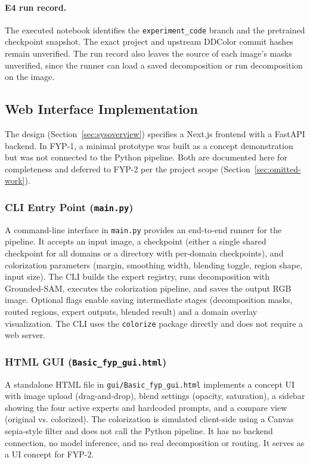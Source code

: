 \documentclass{FastFyp}
\begin{document}
\paragraph{E4 run record.} The executed notebook identifies the
\texttt{experiment\_code} branch and the pretrained checkpoint snapshot. The
exact project and upstream DDColor commit hashes remain unverified. The run
record also leaves the source of each image's masks unverified, since the
runner can load a saved decomposition or run decomposition on the image.

\subsection{Web Interface Implementation}
\label{subsec:web-interface}

The design (Section~\ref{sec:sysoverview}) specifies a Next.js frontend with a FastAPI backend. In FYP-1, a minimal prototype was built as a concept demonstration but was not connected to the Python pipeline. Both are documented here for completeness and deferred to FYP-2 per the project scope (Section~\ref{sec:omitted-work}).

\subsubsection{CLI Entry Point (\texttt{main.py})}
A command-line interface in \texttt{main.py} provides an end-to-end runner for the pipeline. It accepts an input image, a checkpoint (either a single shared checkpoint for all domains or a directory with per-domain checkpoints), and colorization parameters (margin, smoothing width, blending toggle, region shape, input size). The CLI builds the expert registry, runs decomposition with Grounded-SAM, executes the colorization pipeline, and saves the output RGB image. Optional flags enable saving intermediate stages (decomposition masks, routed regions, expert outputs, blended result) and a domain overlay visualization. The CLI uses the \texttt{colorize} package directly and does not require a web server.

\subsubsection{HTML GUI (\texttt{Basic\_fyp\_gui.html})}
A standalone HTML file in \texttt{gui/Basic\_fyp\_gui.html} implements a concept UI with image upload (drag-and-drop), blend settings (opacity, saturation), a sidebar showing the four active experts and hardcoded prompts, and a compare view (original vs. colorized). The colorization is simulated client-side using a Canvas sepia-style filter and does not call the Python pipeline. It has no backend connection, no model inference, and no real decomposition or routing. It serves as a UI concept for FYP-2.
\end{document}
